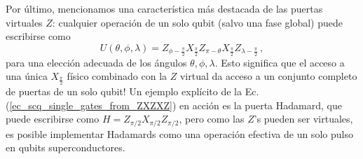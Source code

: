 
    Por último, mencionamos una característica más destacada de las puertas virtuales $Z$: cualquier operación de un solo qubit (salvo una fase global) puede escribirse como
    \begin{equation} \label{ec_scq_single_gates_from_ZXZXZ}
        U (\theta, \phi, \lambda) = Z_{\phi - \frac{\pi}{2}} X_{\frac{\pi}{2}} Z_{\pi - \theta} X_{\frac{\pi}{2}} Z_{\lambda - \frac{\pi}{2}} \, ,
    \end{equation}
    para una elección adecuada de los ángulos $\theta, \phi, \lambda$. Esto significa que el acceso a una única $X_{\frac{\pi}{2}}$ físico combinado con la $Z$ virtual da acceso a un conjunto completo de puertas de un solo qubit! Un ejemplo explícito de la Ec. (\ref{ec_scq_single_gates_from_ZXZXZ}) en acción es la puerta Hadamard, que puede escribirse como $H = Z_{\pi/2} X_{\pi/2} Z_{\pi/2}$, pero como las $Z$'s pueden ser virtuales, es posible implementar Hadamards como una operación efectiva de un solo pulso en qubits superconductores.

